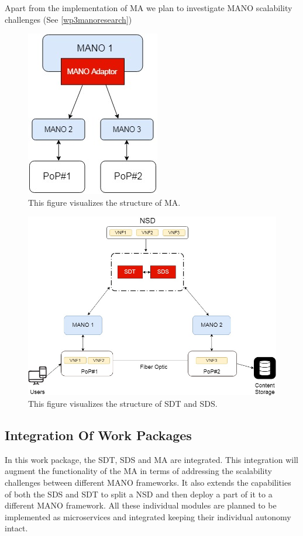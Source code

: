 Apart from the implementation of MA we plan to investigate MANO scalability challenges (See \ref{wp3manoresearch})

\begin{figure}[h]
	\centering
	\includegraphics[width=0.29\linewidth]{figures/Structure2}
	\caption{This figure visualizes the structure of MA. }
	\label{fig:structure2}
\end{figure}

\begin{figure}[h]
	\centering
	\includegraphics[width=0.7\linewidth]{figures/Structure1}
	\caption{This figure visualizes the structure of SDT and SDS. }
	\label{fig:structure1}
\end{figure}

\subsection{Integration Of Work Packages}
In this work package, the SDT, SDS and MA are integrated. This integration will augment the functionality of the MA in terms of addressing the scalability challenges between different MANO frameworks. It also extends the capabilities of both the SDS and SDT to split a NSD and then deploy a part of it to a different MANO framework. All these individual modules are planned to be implemented as microservices and integrated keeping their individual autonomy intact. 

